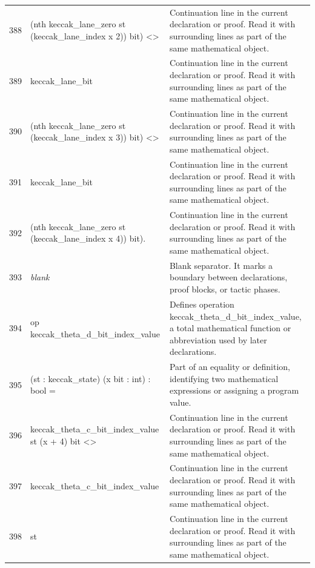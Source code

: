 \documentclass[10pt]{article}
\begin{document}
\begin{longtable}{r L{0.53\textwidth} L{0.37\textwidth}}
388 & {\ttfamily\scriptsize        (nth keccak\_lane\_zero st (keccak\_lane\_index x 2)) bit) <>} & Continuation line in the current declaration or proof.  Read it with surrounding lines as part of the same mathematical object. \\
389 & {\ttfamily\scriptsize     keccak\_lane\_bit} & Continuation line in the current declaration or proof.  Read it with surrounding lines as part of the same mathematical object. \\
390 & {\ttfamily\scriptsize       (nth keccak\_lane\_zero st (keccak\_lane\_index x 3)) bit) <>} & Continuation line in the current declaration or proof.  Read it with surrounding lines as part of the same mathematical object. \\
391 & {\ttfamily\scriptsize    keccak\_lane\_bit} & Continuation line in the current declaration or proof.  Read it with surrounding lines as part of the same mathematical object. \\
392 & {\ttfamily\scriptsize      (nth keccak\_lane\_zero st (keccak\_lane\_index x 4)) bit).} & Continuation line in the current declaration or proof.  Read it with surrounding lines as part of the same mathematical object. \\
393 & {\ttfamily\scriptsize \emph{blank}} & Blank separator.  It marks a boundary between declarations, proof blocks, or tactic phases. \\
394 & {\ttfamily\scriptsize op keccak\_theta\_d\_bit\_index\_value} & Defines operation keccak\_theta\_d\_bit\_index\_value, a total mathematical function or abbreviation used by later declarations. \\
395 & {\ttfamily\scriptsize    (st : keccak\_state) (x bit : int) : bool =} & Part of an equality or definition, identifying two mathematical expressions or assigning a program value. \\
396 & {\ttfamily\scriptsize   keccak\_theta\_c\_bit\_index\_value st (x + 4) bit <>} & Continuation line in the current declaration or proof.  Read it with surrounding lines as part of the same mathematical object. \\
397 & {\ttfamily\scriptsize   keccak\_theta\_c\_bit\_index\_value} & Continuation line in the current declaration or proof.  Read it with surrounding lines as part of the same mathematical object. \\
398 & {\ttfamily\scriptsize     st} & Continuation line in the current declaration or proof.  Read it with surrounding lines as part of the same mathematical object. \\

\end{longtable}
\end{document}
